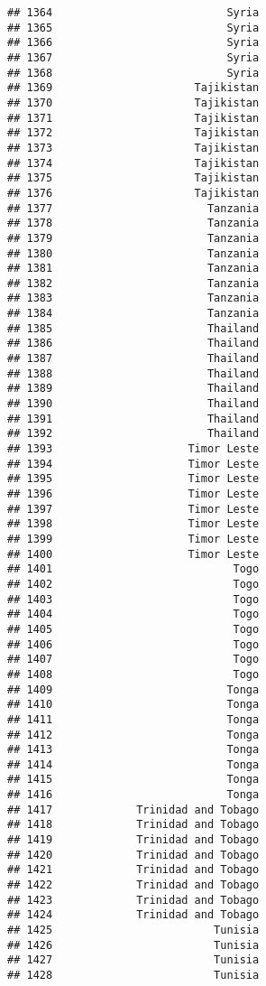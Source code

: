 \documentclass[]{article}
\begin{document}
\begin{verbatim}
## 1364                           Syria
## 1365                           Syria
## 1366                           Syria
## 1367                           Syria
## 1368                           Syria
## 1369                      Tajikistan
## 1370                      Tajikistan
## 1371                      Tajikistan
## 1372                      Tajikistan
## 1373                      Tajikistan
## 1374                      Tajikistan
## 1375                      Tajikistan
## 1376                      Tajikistan
## 1377                        Tanzania
## 1378                        Tanzania
## 1379                        Tanzania
## 1380                        Tanzania
## 1381                        Tanzania
## 1382                        Tanzania
## 1383                        Tanzania
## 1384                        Tanzania
## 1385                        Thailand
## 1386                        Thailand
## 1387                        Thailand
## 1388                        Thailand
## 1389                        Thailand
## 1390                        Thailand
## 1391                        Thailand
## 1392                        Thailand
## 1393                     Timor Leste
## 1394                     Timor Leste
## 1395                     Timor Leste
## 1396                     Timor Leste
## 1397                     Timor Leste
## 1398                     Timor Leste
## 1399                     Timor Leste
## 1400                     Timor Leste
## 1401                            Togo
## 1402                            Togo
## 1403                            Togo
## 1404                            Togo
## 1405                            Togo
## 1406                            Togo
## 1407                            Togo
## 1408                            Togo
## 1409                           Tonga
## 1410                           Tonga
## 1411                           Tonga
## 1412                           Tonga
## 1413                           Tonga
## 1414                           Tonga
## 1415                           Tonga
## 1416                           Tonga
## 1417             Trinidad and Tobago
## 1418             Trinidad and Tobago
## 1419             Trinidad and Tobago
## 1420             Trinidad and Tobago
## 1421             Trinidad and Tobago
## 1422             Trinidad and Tobago
## 1423             Trinidad and Tobago
## 1424             Trinidad and Tobago
## 1425                         Tunisia
## 1426                         Tunisia
## 1427                         Tunisia
## 1428                         Tunisia

\end{verbatim}
\end{document}
